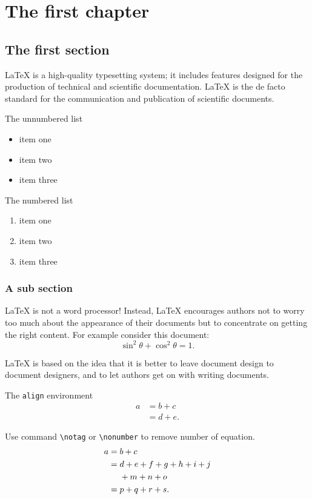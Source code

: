 \documentclass[openany,twoside,12pt]{book}
\theoremstyle{plain}
\numberwithin{equation}{chapter}
\numberwithin{figure}{chapter}
\numberwithin{table}{chapter}
\begin{document}
\mainmatter



\chapter{The first chapter}

\section{The first section}\label{my label}
LaTeX is a high-quality typesetting system; it includes features designed for the production of technical and scientific documentation. LaTeX is the de facto standard for the communication and publication of scientific documents.

The unnumbered list
\begin{itemize}
  \item item one
  \item item two
  \item item three
\end{itemize}

The numbered list
\begin{enumerate}
  \item item one
  \item item two
  \item item three
\end{enumerate}

\subsection{A sub section}
LaTeX is not a word processor! Instead, LaTeX encourages authors not to worry too much about the appearance of their documents but to concentrate on getting the right content. For example consider this document:
\begin{equation}\label{eqn:trifun}
\sin^2{\theta}+\cos^2{\theta}=1.
\end{equation}

LaTeX is based on the idea that it is better to leave document design to document designers, and to let authors get on with writing documents.

The \texttt{align} environment
\begin{align}
a & = b + c \\
& = d + e.
\end{align}

Use command \verb|\notag| or \verb|\nonumber| to remove number of equation.
\begin{align}
a ={} & b + c \\
={} & d + e + f + g + h + i + j \notag \\
& + m + n + o \\
={} & p + q + r + s.
\end{align}
\end{document}
